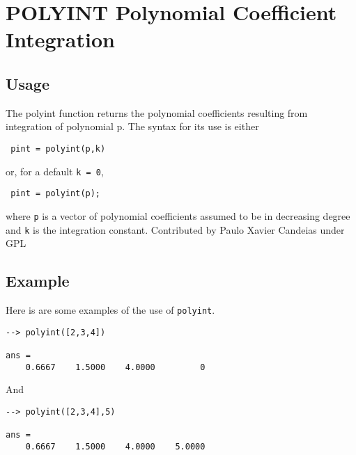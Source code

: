 \section{POLYINT Polynomial Coefficient Integration}

\subsection{Usage}

 The polyint function returns the polynomial coefficients resulting
 from integration of polynomial p. The syntax for its use is either
\begin{verbatim}
 pint = polyint(p,k)
\end{verbatim}
 or, for a default \verb|k = 0|,
\begin{verbatim}
 pint = polyint(p);
\end{verbatim}
 where \verb|p| is a vector of polynomial coefficients assumed to be in
 decreasing degree and \verb|k| is the integration constant.
 Contributed by Paulo Xavier Candeias under GPL
\subsection{Example}

Here is are some examples of the use of \verb|polyint|.
\begin{verbatim}
--> polyint([2,3,4])

ans = 
    0.6667    1.5000    4.0000         0 
\end{verbatim}
And
\begin{verbatim}
--> polyint([2,3,4],5)

ans = 
    0.6667    1.5000    4.0000    5.0000 
\end{verbatim}

